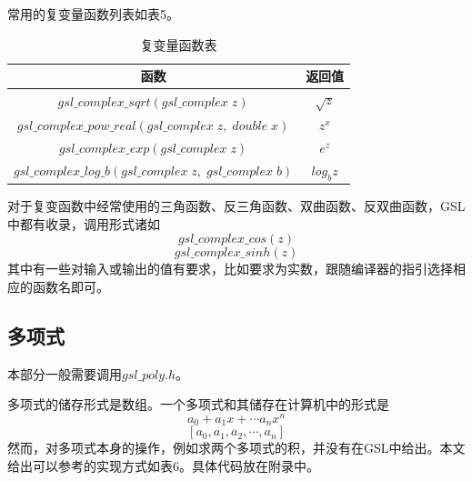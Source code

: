\documentclass[a4paper,11pt,onecolumn,twoside]{article}
\begin{document}
常用的复变量函数列表如表5。\par

\begin{table}
\centering
\renewcommand\arraystretch{2}
\caption{复变量函数表}
\begin{tabular}{|c|c|}
\hline
函数&返回值\\\hline
$gsl\_complex\_sqrt(gsl\_complex\;z)$&$\sqrt{z}$\\\hline
$gsl\_complex\_pow\_real(gsl\_complex\;z,\;double\;x)$&$z^x$\\\hline
$gsl\_complex\_exp(gsl\_complex\;z)$&$e^z$\\\hline
$gsl\_complex\_log\_b(gsl\_complex\;z,\;gsl\_complex\;b)$&$log_bz$\\\hline
\end{tabular}
\end{table}
对于复变函数中经常使用的三角函数、反三角函数、双曲函数、反双曲函数，GSL中都有收录，调用形式诸如
$$
gsl\_complex\_cos(z)
$$
$$
gsl\_complex\_sinh(z)
$$
其中有一些对输入或输出的值有要求，比如要求为实数，跟随编译器的指引选择相应的函数名即可。

\subsection{多项式}
本部分一般需要调用$gsl\_poly.h$。\par

多项式的储存形式是数组。一个多项式和其储存在计算机中的形式是
$$
a_0+a_1x+\cdots a_nx^n
$$
$$
[a_0,a_1,a_2,\cdots,a_n]
$$
然而，对多项式本身的操作，例如求两个多项式的积，并没有在GSL中给出。本文给出可以参考的实现方式如表6。具体代码放在附录中。\par
\end{document}
